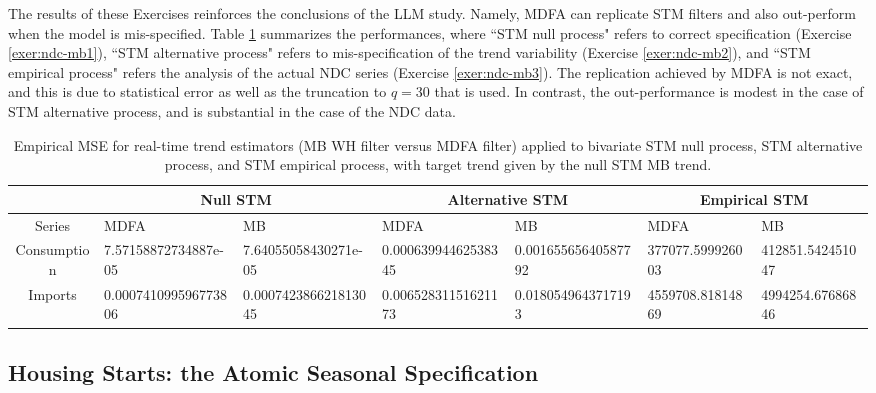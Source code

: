 \documentclass[a4paper]{book}
\begin{document}
    
 The results of these Exercises   reinforces the conclusions of the LLM study.
 Namely, MDFA can replicate STM filters and also out-perform when the model is 
 mis-specified.  Table \ref{tab:ndc.mat} summarizes the performances,
  where ``STM null process" refers to correct specification (Exercise \ref{exer:ndc-mb1}),
  ``STM alternative process" refers to mis-specification of the trend variability
   (Exercise \ref{exer:ndc-mb2}), and ``STM empirical process" refers
   the analysis of the actual NDC series (Exercise \ref{exer:ndc-mb3}).
   The replication achieved by MDFA is not exact, and this is due to statistical
    error as well as the truncation to $q = 30$ that is used.  In contrast,
   the out-performance is modest in the case of STM alternative process,
   and is substantial in the case of the NDC data.
 
 \begin{table}[]
\centering
\caption{Empirical MSE for real-time trend estimators (MB WH filter versus
 MDFA filter) applied to bivariate STM null process,  STM alternative process,
 and STM empirical process,  with target trend
 given by the null STM MB trend.  }
\label{tab:ndc.mat}
\begin{tabular}{cllllll}
\hline
& \multicolumn{2}{c}{Null STM} &\multicolumn{2}{c}{Alternative STM} &
  \multicolumn{2}{c}{Empirical STM} \\
\hline
  Series 	 &  MDFA    &  MB  &  MDFA    &  MB    &  MDFA    &  MB   \\
  Consumption &   7.57158872734887e-05 & 7.64055058430271e-05 & 
    0.00063994462538345  &  0.00165565640587792    &  
    377077.599926003 &   412851.542451047 \\
  Imports	 &   0.000741099596773806 & 0.000742386621813045 & 
    0.00652831151621173  &  0.0180549643717193    &  
    4559708.81814869 &   4994254.67686846 \\
\hline      
\end{tabular}
\end{table}
 

\subsection{Housing Starts: the Atomic Seasonal Specification}


 
  
\end{document}
